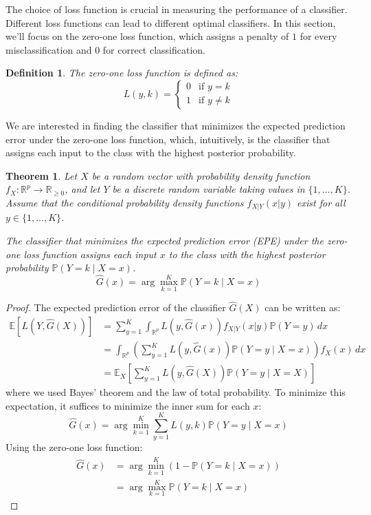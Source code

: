 \documentclass[a4paper,12pt]{article}
\newtheorem{theorem}{Theorem}
\newtheorem{definition}{Definition}
\begin{document}
The choice of loss function is crucial in measuring the performance of a classifier. Different loss functions can lead to different optimal classifiers. In this section, we'll focus on the zero-one loss function, which assigns a penalty of $1$ for every misclassification and $0$ for correct classification.

\begin{definition}
The zero-one loss function is defined as:
\[
L(y, k) = \begin{cases}
0 & \text{if } y = k \\
1 & \text{if } y \neq k
\end{cases}
\]
\end{definition}

We are interested in finding the classifier that minimizes the expected prediction error under the zero-one loss function, which, intuitively, is the classifier that assigns each input to the class with the highest posterior probability.

\begin{theorem}
Let $X$ be a random vector with probability density function $f_X: \mathbb{R}^p \to \mathbb{R}_{\geq 0}$, and let $Y$ be a discrete random variable taking values in $\{1,\ldots,K\}$. Assume that the conditional probability density functions $f_{X|Y}(x|y)$ exist for all $y \in \{1,\ldots,K\}$.

The classifier that minimizes the expected prediction error (EPE) under the zero-one loss function assigns each input $x$ to the class with the highest posterior probability $\mathbb{P}(Y = k \mid X = x)$.
\[
\hat{G}(x) = \arg\max_{k=1}^K \mathbb{P}(Y = k \mid X = x)
\]
\end{theorem}

\begin{proof}
The expected prediction error of the classifier $\hat{G}(X)$ can be written as:
\begin{align*}
\mathbb{E}[L(Y, \hat{G}(X))] & = \sum_{y=1}^K \int_{\mathbb{R}^{p}} L(y, \hat{G}(x)) f_{X|Y}(x|y)\mathbb{P}(Y=y)\, dx \\
& = \int_{\mathbb{R}^{p}} \left( \sum_{y=1}^K L(y, \hat{G}(x)) \mathbb{P}(Y = y \mid X = x) \right) f_X(x) \, dx \\
& = \mathbb{E}_X\left[ \sum_{y=1}^K L(y, \hat{G}(X)) \mathbb{P}(Y = y \mid X = X) \right]
\end{align*}
where we used Bayes' theorem and the law of total probability. To minimize this expectation, it suffices to minimize the inner sum for each $x$:
\[
\hat{G}(x) = \arg\min_{k=1}^K \sum_{y=1}^K L(y, k) \mathbb{P}(Y = y \mid X = x)
\]
Using the zero-one loss function:
\begin{align*}
\hat{G}(x) & = \arg\min_{k=1}^K \left(1 - \mathbb{P}(Y = k \mid X = x)\right) \\
& = \arg\max_{k=1}^K \mathbb{P}(Y = k \mid X = x)
\end{align*}
\end{proof}
\end{document}
